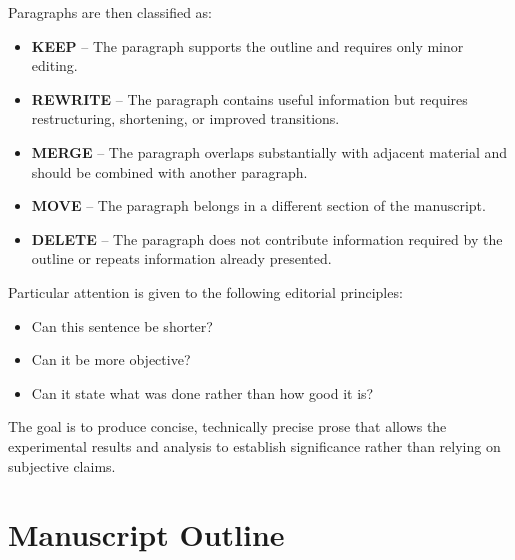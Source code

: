 Paragraphs are then classified as:

\begin{itemize}

\item \textbf{KEEP} -- The paragraph supports the outline and requires
only minor editing.

\item \textbf{REWRITE} -- The paragraph contains useful information but
requires restructuring, shortening, or improved transitions.

\item \textbf{MERGE} -- The paragraph overlaps substantially with
adjacent material and should be combined with another paragraph.

\item \textbf{MOVE} -- The paragraph belongs in a different section of
the manuscript.

\item \textbf{DELETE} -- The paragraph does not contribute information
required by the outline or repeats information already presented.

\end{itemize}

Particular attention is given to the following editorial principles:

\begin{itemize}

\item Can this sentence be shorter?

\item Can it be more objective?

\item Can it state what was done rather than how good it is?

\end{itemize}

The goal is to produce concise, technically precise prose that allows
the experimental results and analysis to establish significance rather
than relying on subjective claims.


\section{Manuscript Outline}

